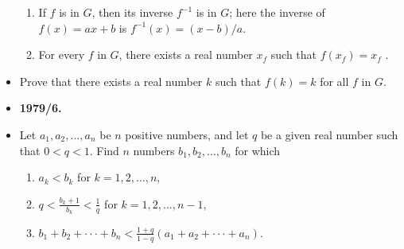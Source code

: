 \documentclass[a4paper,12pt]{article}
\begin{document}
\begin{itemize}[label={},leftmargin=0pt]
\begin{enumerate}[label=(\alph*)]
	\item If $f$ is in $G$, then its inverse $f^{-1}$ is in $G$; here the inverse of $f(x) = ax+b$ is $f^{-1}(x) = (x - b)/a$.
	\item For every $f$ in $G$, there exists a real number $x_f$ such that $f(x_f ) = x_f$ .
\end{enumerate}
	\item Prove that there exists a real number $k$ such that $f(k) = k$ for all $f$ in $G$.
\item \textbf{\large 1979/6.}
\item Let $a_1, a_2, ..., a_n$ be $n$ positive numbers, and let $q$ be a given real number such that $0 < q < 1$. Find $n$ numbers $b_1, b_2, ..., b_n$ for which
\begin{enumerate}[label=(\alph*)]
	\item $a_k < b_k$ for $k = 1, 2, ... , n,$
	\item $q < \frac{b_k+1}{b_k} < \frac{1}{q}$ for $k = 1, 2, ..., n - 1$,
	\item $b_1 + b_2 + \cdot \cdot \cdot + b_n < \frac{1+q}{1-q}(a_1 + a_2 + \cdot \cdot \cdot + a_n).$
\end{enumerate}
\end{itemize}
\end{document}
